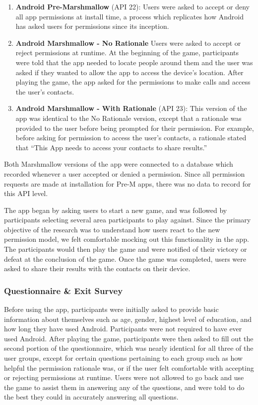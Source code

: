 \documentclass{sig-alternate-05-2015}
\begin{document}
\begin{enumerate}

    \item  \textbf{Android Pre-Marshmallow} (API 22): Users were asked to accept or deny all app permissions at install time, a process which replicates how Android has asked users for permissions since its inception.

    \item  \textbf{Android Marshmallow - No Rationale} Users were asked to accept or reject permissions at runtime. At the beginning of the game, participants were told that the app needed to locate people around them and the user was asked if they wanted to allow the app to access the device's location. After playing the game, the app asked for the permissions to make calls and access the user's contacts.

    \item  \textbf{Android Marshmallow - With Rationale} (API 23): This version of the app was identical to the No Rationale version, except that a rationale was provided to the user before being prompted for their permission. For example, before asking for permission to access the user's contacts, a rationale stated that ``This App needs to access your contacts to share results.''

\end{enumerate}

Both Marshmallow versions of the app were connected to a database which recorded whenever a user accepted or denied a permission. Since all permission requests are made at installation for Pre-M apps, there was no data to record for this API level.

The app began by asking users to start a new game, and was followed by participants selecting several area participants to play against. Since the primary objective of the research was to understand how users react to the new permission model, we felt comfortable mocking out this functionality in the app. The participants would then play the game and were notified of their victory or defeat at the conclusion of the game. Once the game was completed, users were asked to share their results with the contacts on their device. 

\subsubsection{Questionnaire \& Exit Survey}

Before using the app, participants were initially asked to provide basic information about themselves such as age, gender, highest level of education, and how long they have used Android. Participants were not required to have ever used Android. After playing the game, participants were then asked to fill out the second portion of the questionnaire, which was nearly identical for all three of the user groups, except for certain questions pertaining to each group such as how helpful the permission rationale was, or if the user felt comfortable with accepting or rejecting permissions at runtime. Users were not allowed to go back and use the game to assist them in answering any of the questions, and were told to do the best they could in accurately answering all questions.
\end{document}
